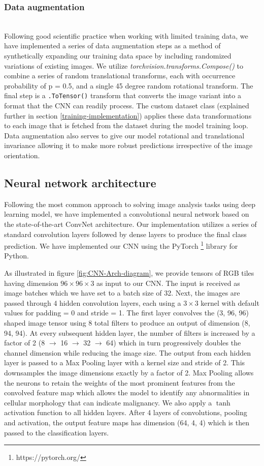 \documentclass{l4proj}
\begin{document}
\subsubsection{Data augmentation}\hfill\\
Following good scientific practice when working with limited training data, we have implemented a series of data augmentation steps as a method of synthetically expanding our training data space by including randomized variations of existing images. We utilize \textit{torchvision.transforms.Compose()} to combine a series of random translational transforms, each with occurrence probability of p = 0.5, and a single 45 degree random rotational transform. The final step is a \texttt{.ToTensor()} transform that converts the image variant into a format that the CNN can readily process. The custom dataset class (explained further in section \ref{training-implementation}) applies these data transformations to each image that is fetched from the dataset during the model training loop. Data augmentation also serves to give our model rotational and translational invariance allowing it to make more robust predictions irrespective of the image orientation. 

\subsection{Neural network architecture} \label{cnn-architecture}
Following the most common approach to solving image analysis tasks using deep learning model, we have implemented a convolutional neural network based on the state-of-the-art ConvNet architecture. Our implementation utilizes a series of standard convolution layers followed by dense layers to produce the final class prediction. We have implemented our CNN using the PyTorch \footnote{https://pytorch.org/} library for Python. 

As illustrated in figure \ref{fig:CNN-Arch-diagram}, we provide tensors of RGB tiles having dimension \(96 \times 96 \times 3\) as input to our CNN. The input is received as image batches which we have set to a batch size of 32. Next, the images are passed through 4 hidden convolution layers, each using a \(3 \times 3\) kernel with default values for padding = 0 and stride = 1. The first layer convolves the (3, 96, 96) shaped image tensor using 8 total filters to produce an output of dimension (8, 94, 94). At every subsequent hidden layer, the number of filters is increased by a factor of 2 (8 \(\rightarrow\) 16 \(\rightarrow\) 32 \(\rightarrow\) 64) which in turn progressively doubles the channel dimension while reducing the image size. The output from each hidden layer is passed to a Max Pooling layer with a kernel size and stride of 2. This downsamples the image dimensions exactly by a factor of 2. Max Pooling allows the neurons to retain the weights of the most prominent features from the convolved feature map which allows the model to identify any abnormalities in cellular morphology that can indicate malignancy. We also apply a \(\tanh\) activation function to all hidden layers. After 4 layers of convolutions, pooling and activation, the output feature maps has dimension (64, 4, 4) which is then passed to the classification layers. 
\\
\end{document}
